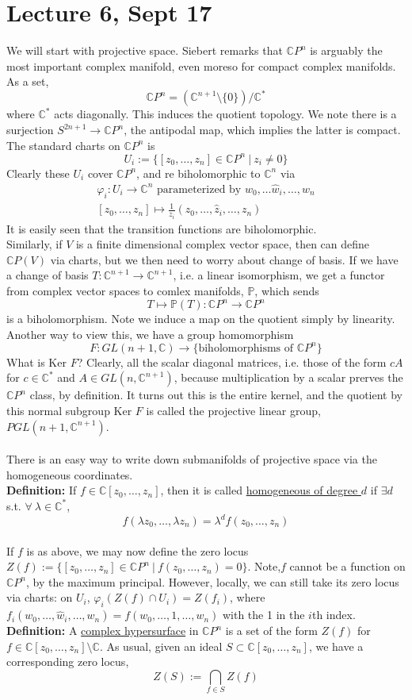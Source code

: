 \documentclass[12pt]{report}
\theoremstyle{definition}
\theoremstyle{remark}
\numberwithin{equation}{section}
\theoremstyle{definition}
\newcommand{\bb}[1]{\mathbb{#1}}
\begin{document}
\section*{Lecture 6, Sept 17}
\label{sec:7}
We will start with projective space. Siebert remarks that $\bb CP^n$ is arguably the most important complex manifold, even moreso for compact complex manifolds. As a set, 
$$
	\bb CP^n = (\bb C^{n+1}\setminus \{0\})\Big/ \bb C^*
$$
where $\bb C^*$ acts diagonally. This induces the quotient topology. We note there is a surjection $S^{2n+1} \to \bb CP^n$, the antipodal map, which implies the latter is compact. The standard charts on $\bb CP^n$ is 
$$
	U_i := \{[z_0,\dots,z_n]\in \bb CP^n\ |\ z_i \ne 0\}
$$
Clearly these $U_i$ cover $\bb CP^n$, and re biholomorphic to $\bb C^n$ via 
\begin{gather*}
	\varphi_i :U_i \to \bb C^n \text{ parameterized by } w_0,\dots\hat w_i, \dots, w_n\\
[z_0,\dots,z_n] \mapsto \frac{1}{z_i}(z_0,\dots,\hat z_i, \dots, z_n) 
\end{gather*}
It is easily seen that the transition functions are biholomorphic. \\
Similarly, if $V$ is a finite dimensional complex vector space, then can define $\bb CP(V)$ via charts, but we then need to worry about change of basis. If we have a change of basis $T: \bb C^{n+1} \to \bb C^{n+1}$, i.e. a linear isomorphism, we get a functor from complex vector spaces to comlex manifolds, $\bb P$, which sends
$$
	T \mapsto \bb P(T):\bb CP^n \to \bb CP^n
$$
is a biholomorphism. Note we induce a map on the quotient simply by linearity. Another way to view this, we have a group homomorphism 
$$
F: GL(n+1, \bb C) \to \{\text{biholomorphisms of }\bb CP^n\}
$$
What is Ker $F$? Clearly, all the scalar diagonal matrices, i.e. those of the form $cA$ for $c \in \bb C^*$ and $A \in GL(n,\bb C^{n+1})$, because multiplication by a scalar prerves the $\bb CP^n$ class, by definition. It turns out this is the entire kernel, and the quotient by this normal subgroup Ker $F$ is called the projective linear group, $PGL(n+1,\bb C^{n+1})$. \\\\
There is an easy way to write down submanifolds of projective space via the homogeneous coordinates. \\
\textbf{Definition: }If $f \in \bb C[z_0,\dots,z_n]$, then it is called \underline{homogeneous of degree $d$} if $\exists d\ $ s.t. $\forall\ \lambda \in \bb C^*$, 
$$
	f(\lambda z_0,\dots, \lambda z_n) = \lambda^d f(z_0,\dots,z_n)
$$
\\
If $f$ is as above, we may now define the zero locus $Z(f):=\{[z_0,\dots,z_n] \in \bb CP^n\ |\ f(z_0,\dots,z_n) = 0 \}$. Note,$f$ cannot be a function on $\bb CP^n$, by the maximum principal. However, locally, we can still take its zero locus via charts: on $U_i$, $\varphi_i(Z(f)\cap U_i) = Z(f_i)$, where $f_i(w_0,\dots,\hat w_i,\dots,w_n) = f(w_0, \dots, 1, \dots, w_n)$ with the 1 in the $i$th index. \\
\textbf{Definition: }A \underline{complex hypersurface} in $\bb CP^n$ is a set of the form $Z(f)$ for $f \in \bb C[z_0,\dots,z_n]\setminus \bb C$. As usual, given an ideal $S \subset \bb C[z_0,\dots,z_n]$, we have a corresponding zero locus, 
$$
Z(S) := \bigcap_{f \in S} Z(f)
$$
\end{document}
